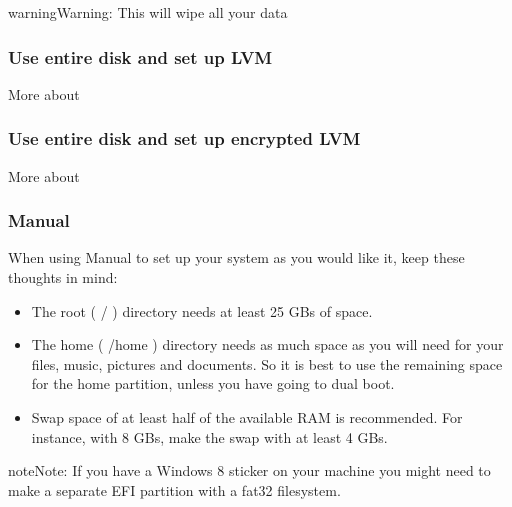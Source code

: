 \documentclass[letterpaper,10pt,english]{sphinxmanual}
\begin{document}
\begin{sphinxadmonition}{warning}{Warning:}
This will wipe all your data
\end{sphinxadmonition}


\subsubsection{Use entire disk and set up LVM}
\label{\detokenize{docs/installation:use-entire-disk-and-set-up-lvm}}
More about 


\subsubsection{Use entire disk and set up encrypted LVM}
\label{\detokenize{docs/installation:use-entire-disk-and-set-up-encrypted-lvm}}
More about 


\subsubsection{Manual}
\label{\detokenize{docs/installation:manual}}

When using Manual to set up your system as you would like it, keep these thoughts in mind:
\begin{itemize}
\item {} 
The root ( / ) directory needs at least 25 GBs of space.

\item {} 
The home ( /home ) directory needs as much space as you will need for your files, music, pictures and documents.
So it is best to use the remaining space for the home partition, unless you have going to dual boot.

\item {} 
Swap space of at least half of the available RAM is recommended. For instance, with 8 GBs, make the swap with at least 4 GBs.

\end{itemize}

\begin{sphinxadmonition}{note}{Note:}
If you have a Windows 8 sticker on your machine you might need to make a separate EFI partition with a fat32 filesystem.
\end{sphinxadmonition}
\end{document}
